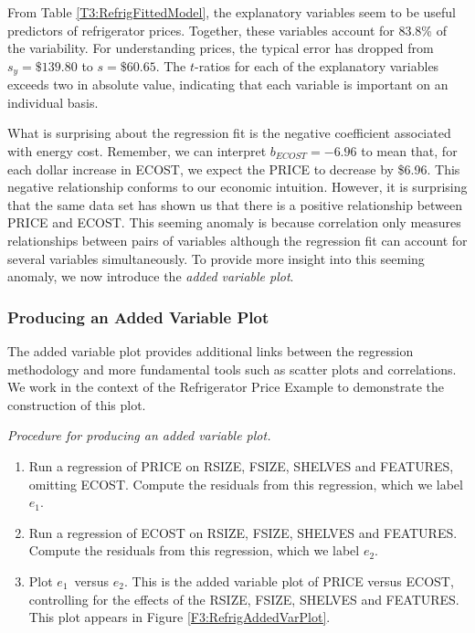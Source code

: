 \noindent From Table \ref{T3:RefrigFittedModel}, the explanatory
variables seem to be useful predictors of refrigerator prices.
Together, these variables account for 83.8\% of the variability. For
understanding prices, the typical error has dropped from
$s_{y}=\$139.80$ to $s=\$60.65$. The $t$-ratios for each of the
explanatory variables exceeds two in absolute value, indicating that
each variable is important on an individual basis.

What is surprising about the regression fit is the negative
coefficient associated with energy cost. Remember, we can interpret
$b_{ECOST}=-6.96$ to mean that, for each dollar increase in ECOST,
we expect the PRICE to decrease by \$6.96. This negative
relationship conforms to our economic intuition. However, it is
surprising that the same data set has shown us that there is a
positive relationship between PRICE and ECOST. This seeming anomaly
is because correlation only measures relationships between pairs of
variables although the regression fit can account for several
variables simultaneously. To provide more insight into this seeming
anomaly, we now introduce the \emph{added variable plot}.

\linejed

\subsubsection*{Producing an Added Variable Plot}

The added variable plot provides additional links between the
regression methodology and more fundamental tools such as scatter
plots and correlations. We work in the context of the Refrigerator
Price Example to demonstrate the construction of this plot.

\bigskip

\boxedjed

\textit{Procedure for producing an added variable plot.}
\begin{enumerate}
\item Run a regression of PRICE on RSIZE, FSIZE, SHELVES and
FEATURES, omitting ECOST. Compute the residuals from this
regression, which we label $e_1$.

\item Run a regression of ECOST on RSIZE, FSIZE, SHELVES and
FEATURES. Compute the residuals from this regression, which we label
$ e_2$.

\item Plot $e_1$\ versus $e_2$. This is the added
variable plot of PRICE versus ECOST, controlling for the effects of
the RSIZE, FSIZE, SHELVES and FEATURES. This plot appears in Figure
\ref{F3:RefrigAddedVarPlot}.
\end{enumerate}

